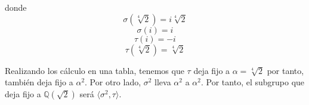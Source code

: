 \begin{enumerate}

\end{enumerate}

donde $$\sigma(\sqrt[4]{2}) = i\sqrt[4]{2}$$
$$\sigma(i) = i$$ $$\tau(i) = -i$$
$$\tau(\sqrt[4]{2}) = \sqrt[4]{2}$$

Realizando los cálculo en una tabla, tenemos que $\tau$ deja fijo a $\alpha = \sqrt[4]{2}$ por tanto, también deja fijo a $\alpha^2$. Por otro lado, $\sigma^2$ lleva $\alpha^2$ a $\alpha^2$. Por tanto, el subgrupo que deja fijo a $\mathbb{Q}(\sqrt{2})$ será $\langle \sigma^2,\tau \rangle$. 
